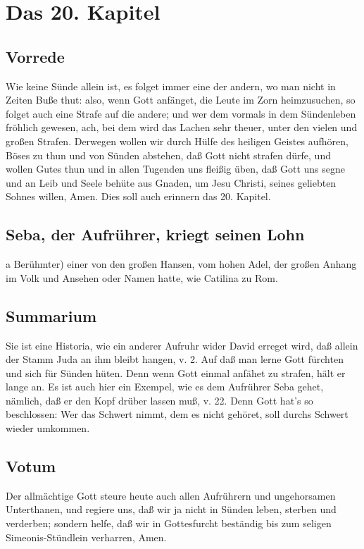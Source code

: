 \chapter{Das 20. Kapitel}

\section{Vorrede}

Wie keine Sünde allein ist, es folget immer eine der andern, wo man nicht in Zeiten Buße thut: also, wenn Gott anfänget, die Leute im Zorn heimzusuchen, so folget auch eine Strafe auf die andere; und wer dem vormals in dem Sündenleben fröhlich gewesen, ach, bei dem wird das Lachen sehr theuer, unter den vielen und großen Strafen. Derwegen wollen wir durch Hülfe des heiligen Geistes aufhören, Böses zu thun und von Sünden abstehen, daß Gott nicht strafen dürfe, und wollen Gutes thun und in allen Tugenden uns fleißig üben, daß Gott uns segne und an Leib und Seele behüte aus Gnaden, um Jesu Christi, seines geliebten Sohnes willen, Amen. Dies soll auch erinnern das 20. Kapitel.

\section{Seba, der Aufrührer, kriegt seinen Lohn}

a Berühmter) einer von den großen Hansen, vom hohen Adel, der großen Anhang im Volk und Ansehen oder Namen hatte, wie Catilina zu Rom.

\section{Summarium}

Sie ist eine Historia, wie ein anderer Aufruhr wider David erreget wird, daß allein der Stamm Juda an ihm bleibt hangen, v. 2. Auf daß man lerne Gott fürchten und sich für Sünden hüten. Denn wenn Gott einmal anfähet zu strafen, hält er lange an. Es ist auch hier ein Exempel, wie es dem Aufrührer Seba gehet, nämlich, daß er den Kopf drüber lassen muß, v. 22. Denn Gott hat’s so beschlossen: Wer das Schwert nimmt, dem es nicht gehöret, soll durchs Schwert wieder umkommen.

\section{Votum}

Der allmächtige Gott steure heute auch allen Aufrührern und ungehorsamen Unterthanen, und regiere uns, daß wir ja nicht in Sünden leben, sterben und verderben; sondern helfe, daß wir in Gottesfurcht beständig bis zum seligen Simeonis-Stündlein verharren, Amen.

